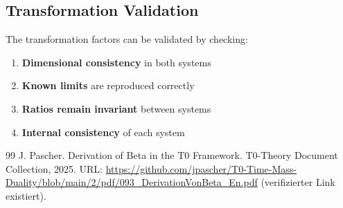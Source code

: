 	\subsection{Transformation Validation}
	\label{subsec:transformation_validation}
	
	The transformation factors can be validated by checking:
	
	\begin{enumerate}
		\item \textbf{Dimensional consistency} in both systems
		\item \textbf{Known limits} are reproduced correctly
		\item \textbf{Ratios remain invariant} between systems
		\item \textbf{Internal consistency} of each system
	\end{enumerate}

\begin{thebibliography}{99}
	J. Pascher.
	\newblock Derivation of Beta in the T0 Framework.
	\newblock T0-Theory Document Collection, 2025.
	\newblock URL: \url{https://github.com/jpascher/T0-Time-Mass-Duality/blob/main/2/pdf/093_DerivationVonBeta_En.pdf}
	(verifizierter Link existiert).
\end{thebibliography}
